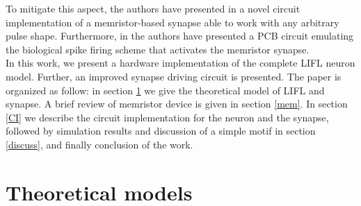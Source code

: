 \documentclass[review]{elsarticle}
\begin{document}
%
%

To mitigate this aspect, the authors have presented in \cite{prime2016} a novel circuit implementation of a memristor-based synapse able to work with any arbitrary pulse shape. Furthermore, in \cite{el} the authors have presented a PCB circuit emulating the biological spike firing scheme that activates the memristor synapse. 
\\In this work, we present a hardware implementation of the complete LIFL neuron model. Further, an improved  synapse driving circuit is presented.
The paper is organized as follow: in section \ref{TM} we give the theoretical model of LIFL and synapse. A brief review of memristor device is given in section \ref{mem}. In section \ref{CI} we describe the circuit implementation for the neuron and the synapse, followed by simulation results and discussion of a simple motif in section \ref{discuss}, and finally conclusion of the work.

\section{Theoretical models}
\label{TM}
\end{document}
